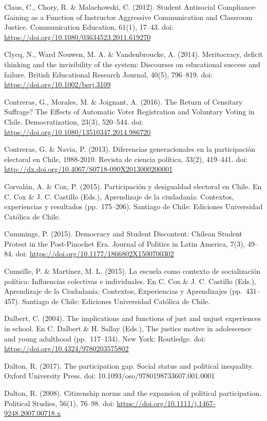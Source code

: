 \documentclass[12pt,twoside]{templates/facsothesis}
\begin{document}
Claus, C., Chory, R. \& Malachowski, C. (2012). Student Antisocial Compliance-Gaining as a Function of Instructor Aggressive Communication and Classroom Justice. Communication Education, 61(1), 17--43. doi: \url{https://doi.org/10.1080/03634523.2011.619270}

Clycq, N., Ward Nouwen, M. A. \& Vandenbroucke, A. (2014). Meritocracy, deficit thinking and the invisibility of the system: Discourses on educational success and failure. British Educational Research Journal, 40(5), 796--819. doi: \url{https://doi.org/10.1002/berj.3109}

Contreras, G., Morales, M. \& Joignant, A. (2016). The Return of Censitary Suffrage? The Effects of Automatic Voter Registration and Voluntary Voting in Chile. Democratization, 23(3), 520--544. doi: \url{https://doi.org/10.1080/13510347.2014.986720}

Contreras, G. \& Navia, P. (2013). Diferencias generacionales en la participación electoral en Chile, 1988-2010. Revista de ciencia política, 33(2), 419--441. doi: \url{http://dx.doi.org/10.4067/S0718-090X2013000200001}

Corvalán, A. \& Cox, P. (2015). Participación y desigualdad electoral en Chile. En C. Cox \& J. C. Castillo (Eds.), Aprendizaje de la ciudadanía: Contextos, experiencias y resultados (pp.~175--206). Santiago de Chile: Ediciones Universidad Católica de Chile.

Cummings, P. (2015). Democracy and Student Discontent: Chilean Student Protest in the Post-Pinochet Era. Journal of Politics in Latin America, 7(3), 49--84. doi: \url{https://doi.org/10.1177/1866802X1500700302}

Cumsille, P. \& Martínez, M. L. (2015). La escuela como contexto de socialización política: Influencias colectivas e individuales. En C. Cox \& J. C. Castillo (Eds.), Aprendizaje de la Ciudadanía: Contextos, Experiencias y Aprendizajes (pp.~431--457). Santiago de Chile: Ediciones Universidad Católica de Chile.

Dalbert, C. (2004). The implications and functions of just and unjust experiences in school. En C. Dalbert \& H. Sallay (Eds.), The justice motive in adolescence and young adulthood (pp.~117--134). New York: Routledge. doi: \url{https://doi.org/10.4324/9780203575802}

Dalton, R. (2017). The participation gap. Social status and political inequality. Oxford University Press. doi: 10.1093/oso/9780198733607.001.0001

Dalton, R. (2008). Citizenship norms and the expansion of political participation. Political Studies, 56(1), 76--98. doi: \url{https://doi.org/10.1111/j.1467-9248.2007.00718.x}
\end{document}
